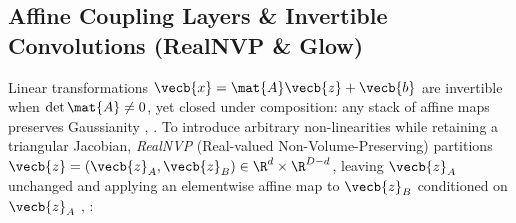 \documentclass[../../../../master.tex]{subfiles}
\begin{document}
\subsection{Affine Coupling Layers \& Invertible Convolutions (RealNVP \& Glow)}

Linear transformations $\vecb{x} = \mat{A}\vecb{z} + \vecb{b}$ are invertible when $\det\mat{A} \ne 0$, yet closed under composition: any stack of affine maps preserves Gaussianity , . To introduce arbitrary non-linearities while retaining a triangular Jacobian, \emph{RealNVP} (Real-valued Non-Volume-Preserving) partitions $\vecb{z} = (\vecb{z}_A, \vecb{z}_B) \in \R^d \times \R^{D-d}$, leaving $\vecb{z}_A$ unchanged and applying an elementwise affine map to $\vecb{z}_B$ conditioned on $\vecb{z}_A$ , :
\end{document}
